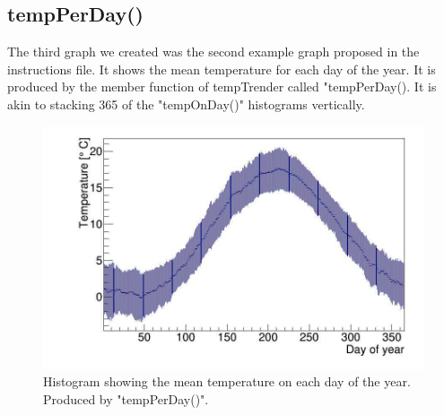 \subsection{tempPerDay()}

The third graph we created was the second example graph proposed in the instructions file. It shows the mean temperature for each day of the year. It is produced by the member function of tempTrender called "tempPerDay(). It is akin to stacking 365 of the "tempOnDay()" histograms vertically. 

\begin{figure}[h]
\centering
\includegraphics[scale=0.3]{graph3.png}
\caption{Histogram showing the mean temperature on each day of the year. Produced by "tempPerDay()". }
\end{figure}